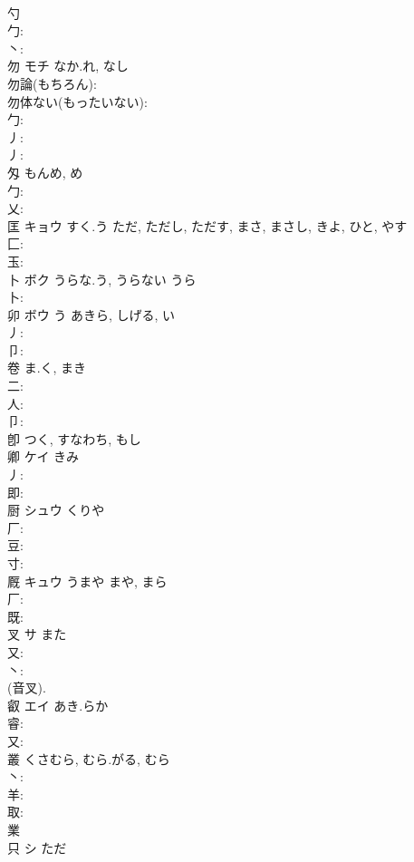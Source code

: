 \documentclass[8pt]{extreport}
\begin{document}
\begin{CJK}{UTF8}{min}
\\	勺						
\\	勹: 
\\	丶: 
\\	勿	モチ	なか.れ, なし		
\\	勿論(もちろん): 
\\	勿体ない(もったいない): 
\\	勹: 
\\	丿: 
\\	丿: 
\\	匁		もんめ, め				
\\	勹: 
\\	乂: 
\\	匡	キョウ	すく.う	ただ, ただし, ただす, まさ, まさし, きよ, ひと, やす	
\\	匚: 
\\	玉: 
\\	卜	ボク	うらな.う, うらない	うら	
\\	卜: 
\\	卯	ボウ	う	あきら, しげる, い	
\\	丿: 
\\	卩: 
\\	卷		ま.く, まき				
\\	二: 
\\	人: 
\\	卩: 
\\	卽		つく, すなわち, もし				
\\	卿	ケイ	きみ		
\\	丿: 
\\	即: 
\\	厨	シュウ	くりや		
\\	厂: 
\\	豆: 
\\	寸: 
\\	厩	キュウ	うまや	まや, まら	
\\	厂: 
\\	既: 
\\	叉	サ	また		
\\	又: 
\\	丶: 
\\	(音叉). 
\\	叡	エイ	あき.らか		
\\	睿: 
\\	又: 
\\	叢		くさむら, むら.がる, むら				
\\	丶: 
\\	羊: 
\\	取: 
\\	業 
\\	只	シ	ただ		

\end{CJK}
\end{document}
